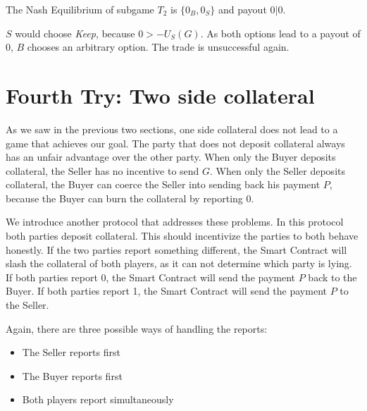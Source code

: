 \documentclass{cacthesis}
\begin{document}
The Nash Equilibrium of subgame $T_2$ is $\{0_B, 0_S\}$ and payout $0 | 0$. \newline

$S$ would choose \emph{Keep}, because $0>-U_S(G)$.\newline
As both options lead to a payout of 0, $B$ chooses an arbitrary option. The trade is unsuccessful again.


\section{Fourth Try: Two side collateral}
\label{sec:two-side-collateral}
As we saw in the previous two sections, one side collateral does not lead to a game that achieves our goal. The party that does not deposit collateral always has an unfair advantage over the other party.
When only the Buyer deposits collateral, the Seller has no incentive to send $G$.
When only the Seller deposits collateral, the Buyer can coerce the Seller into sending back his payment $P$, because the Buyer can burn the collateral by reporting 0.\newline 

We introduce another protocol that addresses these problems. In this protocol both parties deposit collateral. This should incentivize the parties to both behave honestly.
If the two parties report something different, the Smart Contract will slash the collateral of both players, as it can not determine which party is lying. If both parties report 0, the Smart Contract will send the payment $P$ back to the Buyer. If both parties report 1, the Smart Contract will send the payment $P$ to the Seller.  \newline

Again, there are three possible ways of handling the reports:
\begin{itemize}
    \item The Seller reports first
    \item The Buyer reports first
    \item Both players report simultaneously
\end{itemize}
\end{document}
